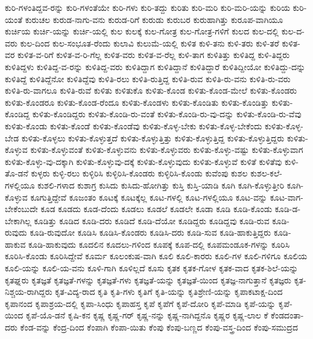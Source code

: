 {ಕುರಿ-ಗಳಂತಿದ್ದವ-ರನ್ನು
ಕುರಿ-ಗಳಂತೆಯೇ
ಕುರಿ-ಗಳು
ಕುರಿ-ತದ್ದು
ಕುರಿತು
ಕುರಿ-ಮರಿ
ಕುರಿ-ಮರಿ-ಯನ್ನು
ಕುರಿಯ
ಕುರಿ-ಯಂತೆ
ಕುರುಚಲ
ಕುರುಡ-ನಾಗು-ವನು
ಕುರುಡ-ರಿಗೆ
ಕುರುಡು
ಕುರುಬರ
ಕುರುಹಾಗಿತ್ತು
ಕುರೂಪ-ವಾಗಿಯೂ
ಕುರ್ಚಿಯ
ಕುರ್ಚಿ-ಯನ್ನು
ಕುರ್ಚಿ-ಯಲ್ಲಿ
ಕುಲ
ಕುಲಕ್ಕೆ
ಕುಲ-ಗೋತ್ರ
ಕುಲ-ಗೋತ್ರ-ಗಳಿಗೆ
ಕುಲದ
ಕುಲ-ದಲ್ಲಿ
ಕುಲ-ದ-ವರು
ಕುಲ-ದಿಂದ
ಕುಲ-ಸಂಭೂತ-ರೆಂದು
ಕುಲಾವಿ
ಕುಲುಮೆ-ಯಲ್ಲಿ
ಕುಳಿತ
ಕುಳಿ-ತನು
ಕುಳಿ-ತರು
ಕುಳಿ-ತರೆ
ಕುಳಿತ-ವರ
ಕುಳಿತ-ವ-ರಿಗೆ
ಕುಳಿತ-ವ-ರಿ-ಗೆಲ್ಲ
ಕುಳಿತ-ವರು
ಕುಳಿತ-ವ-ರೆಲ್ಲ
ಕುಳಿ-ತಾಗ
ಕುಳಿತಿತ್ತು
ಕುಳಿತಿದ್ದ
ಕುಳಿ-ತಿದ್ದರು
ಕುಳಿತಿದ್ದಳು
ಕುಳಿತಿದ್ದ-ವ-ರನ್ನು
ಕುಳಿತಿದ್ದ-ವರು
ಕುಳಿತಿದ್ದಾಗ
ಕುಳಿತಿದ್ದಾನೆ
ಕುಳಿತಿದ್ದಾರೆ
ಕುಳಿತಿದ್ದೀಯೋ
ಕುಳಿತಿದ್ದು-ದನ್ನು
ಕುಳಿತಿದ್ದೆ
ಕುಳಿತಿದ್ದೆನೋ
ಕುಳಿತಿದ್ದೆವು
ಕುಳಿತಿ-ರಲು
ಕುಳಿತಿ-ರುತ್ತಿದ್ದ
ಕುಳಿತಿ-ರುವ
ಕುಳಿತಿ-ರು-ವನು
ಕುಳಿತಿ-ರು-ವರು
ಕುಳಿತಿ-ರು-ವಾಗಲೂ
ಕುಳಿತಿ-ರುವೆ
ಕುಳಿತು
ಕುಳಿತುಕೊ
ಕುಳಿತು-ಕೊಂಡ
ಕುಳಿತು-ಕೊಂಡ-ಮೇಲೆ
ಕುಳಿತು-ಕೊಂಡರು
ಕುಳಿತು-ಕೊಂಡರೂ
ಕುಳಿತು-ಕೊಂಡ-ರೆಂದೂ
ಕುಳಿತು-ಕೊಂಡಳು
ಕುಳಿತು-ಕೊಂಡಿತು
ಕುಳಿತು-ಕೊಂಡಿತ್ತು
ಕುಳಿತು-ಕೊಂಡಿದ್ದ
ಕುಳಿತು-ಕೊಂಡಿದ್ದರು
ಕುಳಿತು-ಕೊಂಡಿ-ರು-ವಂತೆ
ಕುಳಿತು-ಕೊಂಡಿ-ರು-ವು-ದನ್ನು
ಕುಳಿತು-ಕೊಂಡಿ-ರು-ವೆವು
ಕುಳಿತು-ಕೊಂಡು
ಕುಳಿತು-ಕೊಂಡೆ
ಕುಳಿತು-ಕೊಂಡೆವು
ಕುಳಿತು-ಕೊಳ್ಳ-ಬೇಕು
ಕುಳಿತು-ಕೊಳ್ಳ-ಬೇಕೆಂದು
ಕುಳಿತು-ಕೊಳ್ಳ-ಬೇಡ
ಕುಳಿತು-ಕೊಳ್ಳಲು
ಕುಳಿತು-ಕೊಳ್ಳುತ್ತದೆ
ಕುಳಿತು-ಕೊಳ್ಳುತ್ತಿತ್ತು
ಕುಳಿತು-ಕೊಳ್ಳುತ್ತಿದ್ದ
ಕುಳಿತು-ಕೊಳ್ಳುತ್ತಿದ್ದರು
ಕುಳಿತು-ಕೊಳ್ಳುವ
ಕುಳಿತು-ಕೊಳ್ಳುವಂತೆ
ಕುಳಿತು-ಕೊಳ್ಳುವನು
ಕುಳಿತು-ಕೊಳ್ಳುವರು
ಕುಳಿತು-ಕೊಳ್ಳು-ವಷ್ಟು
ಕುಳಿತು-ಕೊಳ್ಳುವಾಗ
ಕುಳಿತು-ಕೊಳ್ಳು-ವು-ದಕ್ಕಾಗಿ
ಕುಳಿತು-ಕೊಳ್ಳುವು-ದಕ್ಕೆ
ಕುಳಿತು-ಕೊಳ್ಳುವುದು
ಕುಳಿತು-ಕೊಳ್ಳುವೆ
ಕುಳಿತೆ
ಕುಳಿತೆವು
ಕುಳಿ-ತೊ-ಡನೆ
ಕುಳ್ಳರು
ಕುಳ್ಳಿ-ರಲು
ಕುಳ್ಳಿರಿಸಿ
ಕುಳ್ಳಿರಿಸಿ-ಕೊಂಡರು
ಕುಳ್ಳಿರಿಸಿ-ಕೊಂಡು
ಕುವೆಂಪು
ಕುಶಲ
ಕುಶಲ-ಕಲೆ-ಗಳಲ್ಲಿಯೂ
ಕುಶಲಿ-ಗಳಾದ
ಕುಶಾಗ್ರ
ಕುಸಿದು
ಕುಸಿದು-ಹೋಗಿತ್ತು
ಕುಸ್ತಿ
ಕುಸ್ತಿ-ಯಾಡಿ
ಕೂಗಿ
ಕೂಗಿ-ಕೊಳ್ಳುತ್ತೀರಿ
ಕೂಗಿ-ಕೊಳ್ಳುವ
ಕೂಗುತ್ತಿದ್ದೇವೆ
ಕೂಜಂತಂ
ಕೂಟಕ್ಕೆ
ಕೂಟಕ್ಕೆಲ್ಲ
ಕೂಟ-ಗಳಲ್ಲಿ
ಕೂಟ-ಗಳಲ್ಲಿಯೂ
ಕೂಟ-ವನ್ನು
ಕೂಟ-ವಾಗ-ಬೇಕೆಂಬುದೇ
ಕೂಡ
ಕೂಡದು
ಕೂಡ-ದೆಂದು
ಕೂಡಲು
ಕೂಡಲೆ
ಕೂಡಲೇ
ಕೂಡಾ
ಕೂಡಿ
ಕೂಡಿ-ಕೊಂಡು
ಕೂಡಿ-ಡ-ಬೇಕಾಗಿಲ್ಲ
ಕೂಡಿತ್ತು
ಕೂಡಿದ
ಕೂಡಿ-ದರು
ಕೂಡಿದೆ
ಕೂಡಿ-ದೆಯೋ
ಕೂಡಿದ್ದರು
ಕೂಡಿದ್ದವು
ಕೂಡಿ-ರುವ
ಕೂಡಿ-ರುವುದು
ಕೂಡಿ-ರುವುದೋ
ಕೂಡಿಸಿ
ಕೂಡಿಸಿ-ಕೊಂಡರು
ಕೂಡಿಸಿ-ದರು
ಕೂಡಿ-ಸುವ
ಕೂಡಿ-ಹಾಕುತ್ತಿದ್ದರು
ಕೂಡಿ-ಹಾಕುವ
ಕೂಡಿ-ಹಾಕುವುದು
ಕೂದಲಿನ
ಕೂದಲು-ಗಳಿಂದ
ಕೂಪಕ್ಕೆ
ಕೂಪ-ದಲ್ಲಿ
ಕೂಪಮಂಡೂಕ-ಗಳನ್ನು
ಕೂರಿಸಿ
ಕೂರಿಸಿ-ಕೊಂಡು
ಕೂರಿಸಿದ್ದೇವೆ
ಕೂರ್ಮ
ಕೂಲಂಕುಷ-ವಾಗಿ
ಕೂಲಿ
ಕೂಲಿ-ಕಾರರು
ಕೂಲಿ-ಗಳ
ಕೂಲಿ-ಗಳಿಗೂ
ಕೂಲಿಯ
ಕೂಲಿ-ಯನ್ನು
ಕೂಲಿ-ಯ-ವನು
ಕೂಳಿ-ಗಾಗಿ
ಕೂಳಿಲ್ಲದೆ
ಕೂಸು
ಕೃತಕ
ಕೃತಕ-ಗೋಳ
ಕೃತಕ-ವಾದ
ಕೃತಕ-ಶಿಲೆ-ಯನ್ನು
ಕೃತಘ್ನರು
ಕೃತಜ್ಞತೆ
ಕೃತಜ್ಞತೆ-ಗಳನ್ನು
ಕೃತಜ್ಞತೆ-ಗಳು
ಕೃತಜ್ಞತೆ-ಯನ್ನು
ಕೃತಜ್ಞತೆ-ಯಿಂದ
ಕೃತಜ್ಞ-ನಾಗುತ್ತಾನೆ
ಕೃತಜ್ಞರು
ಕೃತ-ನಿಶ್ಚಯ-ರಾಗಿದ್ದರು
ಕೃತ-ವಿದ್ಯ-ರಾದ
ಕೃತಿ
ಕೃತಿ-ಗಳು
ಕೃತಿಗೆ
ಕೃತಿ-ಯನ್ನು
ಕೃತಿಶ್ರೇಣಿ-ಯನ್ನು
ಕೃಪಾಕಟಾಕ್ಷ-ದಿಂದ
ಕೃಪಾನಂದ
ಕೃಪಾಶ್ರಯ-ದಲ್ಲಿ
ಕೃಪಾ-ಸಿಂಧು
ಕೃಪಾಹಸ್ತ
ಕೃಪೆ
ಕೃಪೆಗೆ
ಕೃಪೆ-ದೋರಿ
ಕೃಪೆ-ಮಾಡಿ
ಕೃಪೆ-ಯನ್ನು
ಕೃಪೆ-ಯಿಂದ
ಕೃಪೆ-ಯೊ-ಡನೆ
ಕೃಷಿ-ಕನ
ಕೃಷ್ಣ
ಕೃಷ್ಣ-ಗರ್
ಕೃಷ್ಣ-ನನ್ನು
ಕೃಷ್ಣ-ನಾಗಿದ್ದನೊ
ಕೃಷ್ಣರ
ಕೃಷ್ಣ-ಲಾಲ
ಕೆ
ಕೆಂಡದಂತಾ-ದರು
ಕೆಂಡ-ವನ್ನು
ಕೆಂದ್ರ-ದಿಂದ
ಕೆಂಪಾಗಿ
ಕೆಂಪಾ-ಯಿತು
ಕೆಂಪು
ಕೆಂಪು-ಬಣ್ಣದ
ಕೆಂಪು-ವಸ್ತ್ರ-ದಿಂದ
ಕೆಂಪು-ಸಮುದ್ರದ
}
